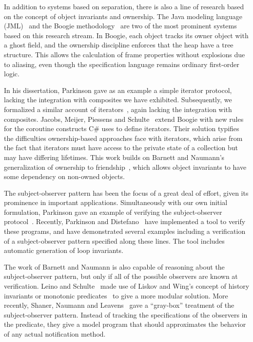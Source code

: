 \documentclass[preprint,natbib]{sigplanconf}
\begin{document}
In addition to systems based on separation, there is also a line of
research based on the concept of object invariants and ownership.  The
Java modeling language (JML)~\cite{jml} and the Boogie
methodology~\cite{boogie} are two of the most prominent systems based
on this research stream. In Boogie, each object tracks its owner
object with a ghost field, and the ownership discipline enforces that
the heap have a tree structure. This allows the calculation of frame
properties without explosions due to aliasing, even though the
specification language remains ordinary first-order logic.

In his dissertation, Parkinson gave as an example a simple iterator
protocol, lacking the integration with composites we have exhibited.
Subsequently, we formalized a similar account of
iterators~\cite{iterator}, again lacking the integration with
composites. Jacobs, Meijer, Piessens and
Schulte~\cite{iterators-revisited} extend Boogie with new rules for
the coroutine constructs C\# uses to define iterators. Their solution
typifies the difficulties ownership-based approaches face with
iterators, which arise from the fact that iterators must have access
to the private state of a collection but may have differing
lifetimes. This work builds on Barnett and Naumann's generalization of
ownership to friendship~\cite{friends}, which allows object invariants
to have some dependency on non-owned objects.

The subject-observer pattern has been the focus of a great deal of effort,
given its prominence in important applications. Simultaneously with our own
initial formulation, Parkinson gave an example of verifying the
subject-observer protocol~\cite{parkinson-so}. Recently, Parkinson and
Distefano~\cite{jstar-parkinson-distefano} have implemented a tool to verify
these programs, and have demonstrated several examples including a verification
of a subject-observer pattern specified along these lines. The tool includes
automatic generation of loop invariants. 

The work of Barnett and Naumann is also capable of reasoning about the
subject-observer pattern, but only if all of the possible observers
are known at verification.  Leino and Schulte~\cite{boogie-sub-obs}
made use of Liskov and Wing's concept of history invariants or
monotonic predicates~\cite{liskov-wing} to give a more modular
solution. More recently, Shaner, Naumann and Leavens~\cite{ShanerLN07}
gave a ``gray-box'' treatment of the subject-observer pattern.
Instead of tracking the specifications of the observers in the
predicate, they give a model program that should approximates the
behavior of any actual notification method.
\end{document}
